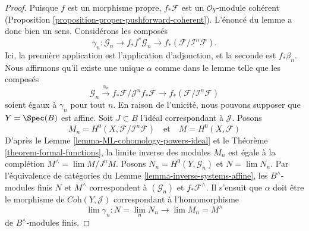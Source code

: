 \begin{proof}
Puisque $f$ est un morphisme propre, $f_*\mathcal{F}$ est un
$\mathcal{O}_Y$-module cohérent
(Proposition \ref{proposition-proper-pushforward-coherent}).
L'énoncé du lemme a donc bien un sens.
Considérons les composés
$$
\gamma_n : \mathcal{G}_n \to
f_*f^*\mathcal{G}_n \to
f_*(\mathcal{F}/\mathcal{I}^n\mathcal{F}).
$$
Ici, la première application est l'application d'adjonction, et la seconde
est $f_*\beta_n$. Nous affirmons qu'il existe une unique $\alpha$ comme dans
le lemme telle que les composés
$$
\mathcal{G}_n \xrightarrow{\alpha_n}
f_*\mathcal{F}/\mathcal{J}^nf_*\mathcal{F} \to
f_*(\mathcal{F}/\mathcal{I}^n\mathcal{F})
$$
soient égaux à $\gamma_n$ pour tout $n$. En raison de l'unicité, nous pouvons
supposer que $Y = \Spec(B)$ est affine. Soit $J \subset B$ l'idéal
correspondant à $\mathcal{J}$. Posons
$$
M_n = H^0(X, \mathcal{F}/\mathcal{I}^n\mathcal{F})
\quad\text{et}\quad
M = H^0(X, \mathcal{F})
$$
D'après le Lemme \ref{lemma-ML-cohomology-powers-ideal} et le
Théorème \ref{theorem-formal-functions},
la limite inverse des modules
$M_n$ est égale à la complétion $M^\wedge = \lim M/J^nM$.
Posons $N_n = H^0(Y, \mathcal{G}_n)$ et $N = \lim N_n$.
Par l'équivalence de catégories du
Lemme \ref{lemma-inverse-systems-affine},
les $B^\wedge$-modules finis $N$ et $M^\wedge$ correspondent
à $(\mathcal{G}_n)$ et $f_*\mathcal{F}^\wedge$.
Il s'ensuit que $\alpha$ doit être le morphisme de
$\textit{Coh}(Y, \mathcal{J})$ correspondant à l'homomorphisme
$$
\lim \gamma_n : N = \lim_n N_n \longrightarrow \lim M_n = M^\wedge
$$
de $B^\wedge$-modules finis.


\end{proof}
